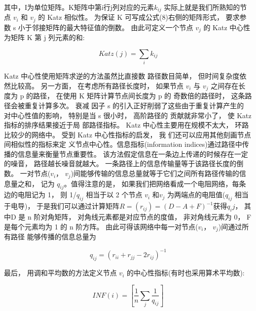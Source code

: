 				其中，I为单位矩阵。K矩阵中第i行j列对应的元素$k_{ij}$ 实际上就是我们所熟知的节点 $v_i$ 和 $v_j$ 的 Katz 相似性\parencite{L2011Link}。 为保证 K 可写成公式(8)右侧的矩阵形式， 要求参数 s 小于邻接矩阵的最大特征值的倒数。 由此可定义一个节点 $v_j$ 的 Katz 中心性为矩阵 K 第 j 列元素的和:

				$$Katz(j)=\sum\limits_i {k_{ij}}$$

				Katz 中心性使用矩阵求逆的方法虽然比直接数 路径数目简单， 但时间复杂度依然比较高。 另一方面， 在考虑所有路径长度时， 如果节点 $v_i$ 与 $v_j$ 之间存在长 度为 p 的路径， 在使用 K 矩阵计算节点间长度为 p 的 奇数倍的路径时， 这条路径会被重复计算多次。 衰减 因子 s 的引入正好削弱了这些由于重复计算产生的 对中心性值的影响， 特别是当 s 很小时， 高阶路径的 贡献就非常小了， 使 Katz 指标的排序结果接近于局 部路径指标。 Katz 中心性主要用在规模不太大， 环路 比较少的网络中。 受到 Katz 中心性指标的启发， 我 们还可以应用其他刻画节点间相似性的指标\parencite{L2011Link}来定 义节点中心性。信息指标(information indices)\parencite{Stephenson1989Rethinking}通过路径中传播的信息量来衡量节点重要性。 该方法假定信息在一条边上传递的时候存在一定的噪音， 路径越长噪音就越大。 一条路径上的信息传输量等于该路径长度的倒数。 一对节点($v_i$， $v_j$)间能够传输的信息总量就等于它们之间所有路径传输的信息量之和， 记为 $q_{ij}$。值得注意的是， 如果我们把网络看成一个电阻网络，每条边的电阻记为 1， 则 1/$q_{ij}$ 相当于以 2 个节点 $v_i$ 和$v_j$ 为两端点的电阻值($q_{ij}$ 相当于电导)\parencite{Altmann1993Reinterpreting}， 于是我们可以通过计算矩阵$R=(r_{ij})=(D-A+F)^{-1}$获得$q_ij$， 其中D 是 n 阶对角矩阵， 对角线元素都是对应节点的度值， 非对角线元素为 0， F 是每个元素均为 1 的 n 阶方阵。 由此可得该网络中每一对节点($v_i$， $v_j$)间通过所有路径 能够传播的信息总量为

				$$q_{ij}=(r_{ii}+r_{jj}-2r_{ij})^{-1}$$

				最后， 用调和平均数的方法定义节点 $v_i$ 的中心性指标(有时也采用算术平均数)\parencite{Poulin2000Dynamical}:

				$$ INF(i)=[\frac{1}{n} \sum\limits_j {\frac{1}{q_{ij}}}] $$

